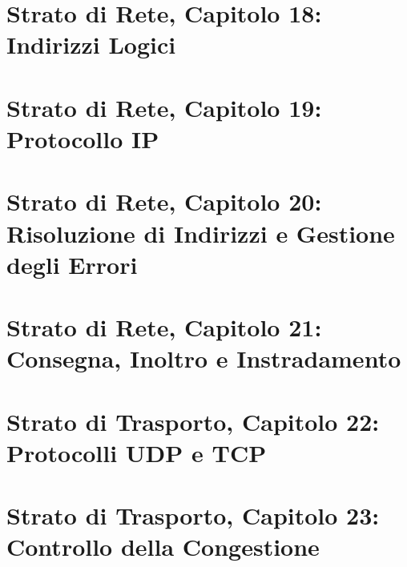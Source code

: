 \documentclass[12pt]{report}
\begin{document}
\chapter{Strato di Rete, Capitolo 18: Indirizzi Logici}


\chapter{Strato di Rete, Capitolo 19: Protocollo IP}


\chapter{Strato di Rete, Capitolo 20: Risoluzione di Indirizzi e Gestione degli Errori}


\chapter{Strato di Rete, Capitolo 21: Consegna, Inoltro e Instradamento}


\chapter{Strato di Trasporto, Capitolo 22: Protocolli UDP e TCP}


\chapter{Strato di Trasporto, Capitolo 23: Controllo della Congestione}

\end{document}
